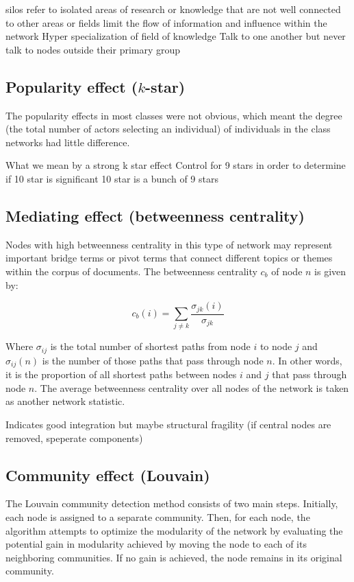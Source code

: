 silos refer to isolated areas of research or knowledge that are not well connected to other areas or fields
limit the flow of information and influence within the network
Hyper specialization of field of knowledge
Talk to one another but never talk to nodes outside their primary group

\subsection{Popularity effect ($k$-star)}
The popularity effects in most classes were not obvious, which meant the degree (the total number of actors selecting an individual) of individuals in the class networks had little difference.

What we mean by a strong k star effect
Control for 9 stars in order to determine if 10 star is significant
10 star is a bunch of 9 stars

\subsection{Mediating effect (betweenness centrality)}

Nodes with high betweenness centrality in this type of network may represent important bridge terms or pivot terms that connect different topics or themes within the corpus of documents. The betweenness centrality $c_b$ of node $n$ is given by:

$$
c_b(i) = \sum_{j \ne k} \frac{\sigma_{jk}(i)}{\sigma_{jk}}
$$

Where $\sigma_{ij}$ is the total number of shortest paths from node $i$ to node $j$ and $\sigma_{ij}(n)$ is the number of those paths that pass through node $n$. In other words, it is the proportion of all shortest paths between nodes $i$ and $j$ that pass through node $n$. The average betweenness centrality over all nodes of the network is taken as another network statistic. 

Indicates good integration but maybe structural fragility (if central nodes are removed, speperate components)

\subsection{Community effect (Louvain)}

The Louvain community detection method consists of two main steps. Initially, each node is assigned to a separate community. Then, for each node, the algorithm attempts 
to optimize the modularity of the network by evaluating the potential gain in modularity achieved by 
moving the node to each of its neighboring communities. If no gain is achieved, the node remains in 
its original community.

